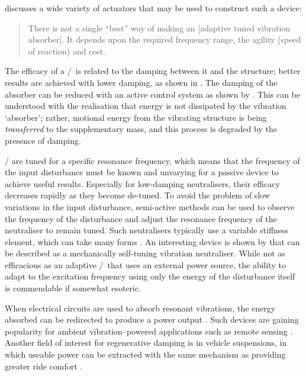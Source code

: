 \textcite{brennan2006} discusses a wide variety of actuators that may be used to construct such a device:
\begin{quote}
There is not a single ``best'' way of making an [adaptive tuned vibration absorber].
It depends upon the required frequency range, the agility (speed of reaction) and cost.
\end{quote}

The efficacy of a \vibneut/\ is related to the damping between it and the structure; better results are achieved with lower damping, as shown in .
The damping of the absorber can be reduced with an active control system as shown by \textcite{kidner1998}.
This can be understood with the realisation that energy is not dissipated by the vibration `absorber'; rather, motional energy from the vibrating structure is being \emph{transferred} to the supplementary mass, and this process is degraded by the presence of damping.

\Vibneut/ are tuned for a specific resonance frequency, which means that the frequency of the input disturbance must be known and unvarying for a passive device to achieve useful results.
Especially for low-damping neutralisers, their efficacy decreases rapidly as they become de-tuned.
To avoid the problem of slow variations in the input disturbance, semi-active methods can be used to observe the frequency of the disturbance and adjust the resonance frequency of the neutraliser to remain tuned.
Such neutralisers typically use a variable stiffness element, which can take many forms \cite{ting-kong1999,kidner2002,holdhusen2007}.
An interesting device is shown by \cite{ivers2008} that can be described as a mechanically self-tuning vibration neutraliser.
While not as efficacious as an adaptive \vibneut/\ that uses an external power source, the ability to adapt to the excitation frequency using only the energy of the disturbance itself is commendable if somewhat esoteric.

When electrical circuits are used to absorb resonant vibrations, the energy absorbed can be redirected to produce a power output \cite{stephen2006}.
Such devices are gaining popularity for ambient vibration--powered applications such as remote sensing \cite{arnold2007}.
Another field of interest for regenerative damping is in vehicle suspensions, in which useable power can be extracted with the same mechanism as providing greater ride comfort \cite{graves2000thesis}.

